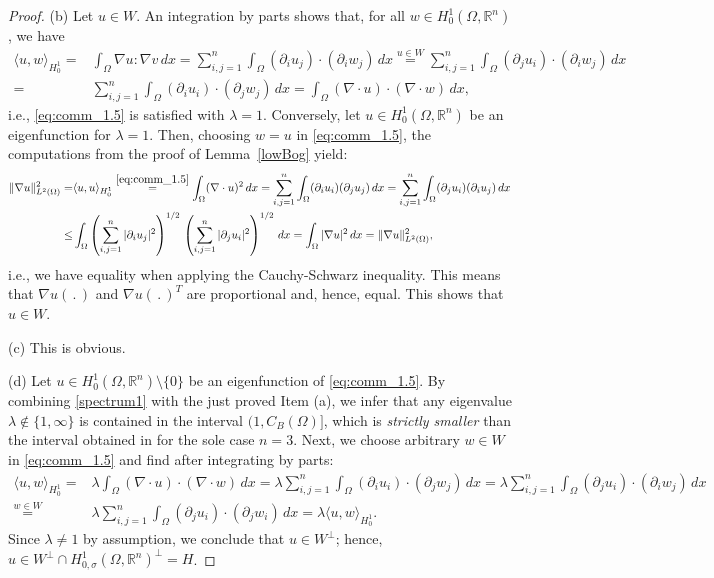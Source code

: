 \documentclass[11pt]{article}
\theoremstyle{plain}
\theoremstyle{definition}
\numberwithin{equation}{section}
\newcommand{\R}{\mathbb{R}}
\begin{document}
\begin{proof}
(b) Let $u\in W$. An integration by parts shows that, for all $w\in  H^1_{0}(\Omega,\R^n)$, we have
	\begin{align*}
		\langle  u,w\rangle_{H^1_0} =&\int_\Omega \nabla u : \nabla v\, dx
		=\sum^n_{i,j=1}\int_\Omega (\partial_i u_j)\cdot(\partial_i w_j) \, dx
		\stackrel{u\in W}{=}
		\sum^n_{i,j=1}\int_\Omega (\partial_j u_i)\cdot(\partial_i w_j) \, dx\\
		=&\sum^n_{i,j=1}\int_\Omega (\partial_i u_i)\cdot(\partial_j w_j) \, dx
		=\int_\Omega (\nabla\cdot  u)\cdot(\nabla \cdot w) \, dx,
	\end{align*}
i.e., \eqref{eq:comm_1.5} is satisfied with $\lambda=1$.
Conversely, let $u\in H^1_{0}(\Omega,\R^n)$ be an eigenfunction for $\lambda=1$. Then, choosing $w=u$ in \eqref{eq:comm_1.5}, the computations from the proof of Lemma~\ref{lowBog} yield:
	\begin{align*}
	\| \nabla u\|^2_{L^2(\Omega )}	=&\langle  u,u\rangle_{H^1_0}
			\stackrel{\eqref{eq:comm_1.5}}{=}
			\int_\Omega (\nabla\cdot  u)^2\, dx =\sum^n_{i,j=1}\int_\Omega (\partial_i u_i)(\partial_j u_j) \, dx=\sum^n_{i,j=1}\int_\Omega (\partial_j u_i)(\partial_i u_j) \, dx\\
		\le&  \int_\Omega \left( \sum_{i,j=1}^n|\partial_i u_{j}|^2\right)^{1/2} \, \left(\sum_{i,j=1}^n |\partial_j u_{i}|^2\right)^{1/2}\, dx
			= \int_\Omega |\nabla u |^2 \, dx= \| \nabla u\|^2_{L^2(\Omega )},
\end{align*}
i.e., we have equality when applying the Cauchy-Schwarz inequality. This means that $\nabla u(\,.\,)$ and $\nabla u(\,.\,)^T$
are proportional and, hence, equal. This shows that $u\in W$.\par
(c)	This is obvious.\par
(d) Let $u\in H^1_{0}(\Omega,\R^n)\setminus \{0\}$ be an eigenfunction of \eqref{eq:comm_1.5}. By combining \eqref{spectrum1} with the
just proved Item (a), we infer that any eigenvalue $\lambda\not\in\{1,\infty\}$ is contained in the interval $(1,C_B(\Omega)]$,
which is {\em strictly smaller} than the interval obtained in \cite[Proposition 3]{Velte_LNM1431_1990} for the sole case $n=3$.
Next, we choose arbitrary $w\in W $ in \eqref{eq:comm_1.5}  and find after integrating by parts:
	\begin{align*}
		\langle  u,w\rangle_{H^1_0} =&\lambda \int_\Omega (\nabla\cdot  u)\cdot(\nabla \cdot w) \, dx
		=\lambda \sum^n_{i,j=1}\int_\Omega (\partial_i u_i)\cdot(\partial_j w_j) \, dx
		=\lambda 	\sum^n_{i,j=1}\int_\Omega (\partial_j u_i)\cdot(\partial_i w_j) \, dx\\
		\stackrel{w\in W}{=}&\lambda 	\sum^n_{i,j=1}\int_\Omega (\partial_j u_i)\cdot(\partial_j w_i) \, dx
		=\lambda \langle  u,w\rangle_{H^1_0}.
	\end{align*}
	Since $\lambda\not=1$ by assumption, we conclude that $u\in W^\perp$; hence, $u\in W^\perp \cap  H^1_{0,\sigma}(\Omega,\R^n)^\perp=H$.
\end{proof}
\end{document}
